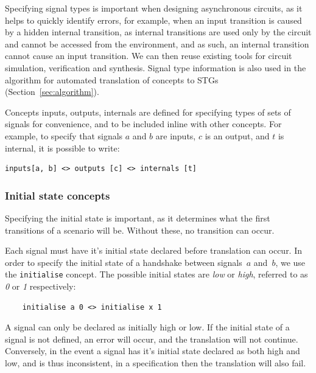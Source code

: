 \documentclass[british,conference,compsoc]{IEEEtran}
\begin{document}
\noindent Specifying signal types is important when designing asynchronous
circuits, as it helps to quickly identify errors, for example, when an input transition is
caused by a hidden internal transition, as internal transitions are used only by the circuit 
and cannot be accessed from the environment, and as such, an internal transition cannot
cause an input transition. We can then reuse existing tools for circuit
simulation, verification and synthesis. Signal type information is also used
in the algorithm for automated translation of concepts to
STGs (Section~\ref{sec:algorithm}).

Concepts \textsf{inputs}, \textsf{outputs}, \textsf{internals} are defined for
specifying types of sets of signals for convenience, and to be included inline 
with other concepts. For example, to specify that signals $a$ and $b$ are 
inputs, $c$ is an output, and $t$ is internal, it is possible to write:

\begin{verbatim}
inputs[a, b] <> outputs [c] <> internals [t]
\end{verbatim}

\vspace{-4mm}

\subsubsection{Initial state concepts\label{sub:initState}}

Specifying the initial state is important, as it determines what the first 
transitions of a scenario will be. Without these, no transition can occur.

Each signal must have it's initial state declared before translation can occur. 
In order to specify the initial state of a handshake between signals~$a$
and~$b$, we use the \texttt{initialise} concept.
The possible initial states are \emph{low} or \emph{high}, referred to as 
\emph{0} or \emph{1} respectively:

\begin{verbatim}
    initialise a 0 <> initialise x 1
\end{verbatim}

\noindent A signal can only be declared as initially high or low. If the 
initial state of a signal is not defined, an error will occur, and the 
translation will not continue. Conversely, in the event a signal has it's 
initial state declared as both high and low, and is thus inconsistent, in a 
specification then the translation will also fail.
\end{document}
